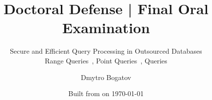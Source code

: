 \title{Doctoral Defense | Final Oral Examination}

\subtitle{
	Secure and Efficient Query Processing in Outsourced Databases \\
	{\small Range Queries~\cite{ore-benchmark-17, epsolute}, Point Queries~\cite{epsolute}, \knn{} Queries}
}

\date{Built from \href{https://git.dbogatov.org/bu/defense/presentation/commit/\version}{\emph{\version}} on \today}

\author{Dmytro Bogatov \\ }


\def\wm{\texttt{[image: coat-of-arms-1]}}
